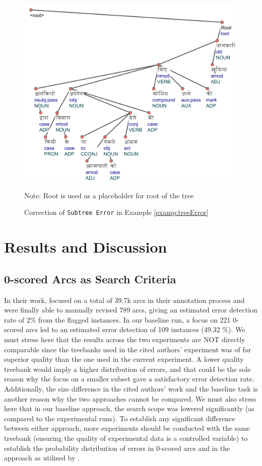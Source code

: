 \begin{figure}[H]
    \centering
    \includegraphics[scale=0.7]{img/treeError2.png}
    \caption{Correction of \texttt{Subtree Error} in Example \ref{examp:treeError}}
    \label{examp:treeError-fig2}
    Note: Root is used as a placeholder for root of the tree
\end{figure}

\section{Results and Discussion}
\label{results:lisca}

\subsection{0-scored Arcs as Search Criteria}

In their work, \cite{alzetta2017dangerous} focused on a total of 39.7k arcs in their annotation process and were finally able to manually revised 789 arcs, giving an estimated error detection rate of 2\% from the flagged instances. In our baseline run, a focus on 221 0-scored arcs led to an estimated error detection of 109 instances (49.32 \%). We must stress here that the results across the two experiments are NOT directly comparable since the treebanks used in the cited authors' experiment was of far superior quality than the one used in the current experiment. A lower quality treebank would imply a higher distribution of errors, and that could be the sole reason why the focus on a smaller subset gave a satisfactory error detection rate. Additionally, the size difference in the cited authors' work and the baseline task is another reason why the two approaches cannot be compared. We must also stress here that in our baseline approach, the search scope was lowered significantly (as compared to the experimental runs). To establish any significant difference between either approach, more experiments should be conducted with the same treebank (ensuring the quality of experimental data is a controlled variable) to establish the probability distribution of errors in 0-scored arcs and in the approach as utilised by \citeauthor{alzetta2017dangerous}.


